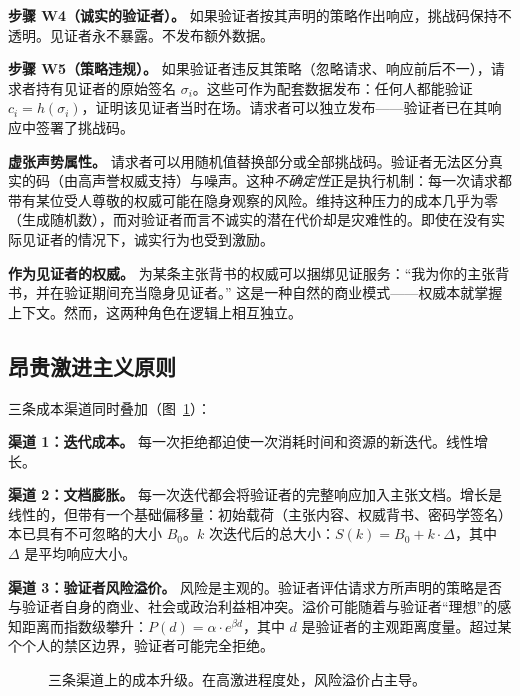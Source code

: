 \documentclass[11pt,a4paper,twocolumn]{article}
\begin{document}
\textbf{步骤 W4（诚实的验证者）。} 如果验证者按其声明的策略作出响应，挑战码保持不透明。见证者永不暴露。不发布额外数据。

\textbf{步骤 W5（策略违规）。} 如果验证者违反其策略（忽略请求、响应前后不一），请求者持有见证者的原始签名 $\sigma_i$。这些可作为配套数据发布：任何人都能验证 $c_i = h(\sigma_i)$，证明该见证者当时在场。请求者可以独立发布——验证者已在其响应中签署了挑战码。

\textbf{虚张声势属性。} 请求者可以用随机值替换部分或全部挑战码。验证者无法区分真实的码（由高声誉权威支持）与噪声。这种\emph{不确定性}正是执行机制：每一次请求都带有某位受人尊敬的权威可能在隐身观察的风险。维持这种压力的成本几乎为零（生成随机数），而对验证者而言不诚实的潜在代价却是灾难性的。即使在没有实际见证者的情况下，诚实行为也受到激励。

\textbf{作为见证者的权威。} 为某条主张背书的权威可以捆绑见证服务：“我为你的主张背书，并在验证期间充当隐身见证者。” 这是一种自然的商业模式——权威本就掌握上下文。然而，这两种角色在逻辑上相互独立。

\subsection{昂贵激进主义原则}

三条成本渠道同时叠加（图~\ref{fig:radicalism}）：

\textbf{渠道 1：迭代成本。} 每一次拒绝都迫使一次消耗时间和资源的新迭代。线性增长。

\textbf{渠道 2：文档膨胀。} 每一次迭代都会将验证者的完整响应加入主张文档。增长是线性的，但带有一个基础偏移量：初始载荷（主张内容、权威背书、密码学签名）本已具有不可忽略的大小 $B_0$。$k$ 次迭代后的总大小：$S(k) = B_0 + k \cdot \Delta$，其中 $\Delta$ 是平均响应大小。

\textbf{渠道 3：验证者风险溢价。} 风险是主观的。验证者评估请求方所声明的策略是否与验证者自身的商业、社会或政治利益相冲突。溢价可能随着与验证者“理想”的感知距离而指数级攀升：$P(d) = \alpha \cdot e^{\beta d}$，其中 $d$ 是验证者的主观距离度量。超过某个个人的禁区边界，验证者可能完全拒绝。

\begin{figure}[ht]
\centering
{}
\caption{三条渠道上的成本升级。在高激进程度处，风险溢价占主导。}
\label{fig:radicalism}
\end{figure}
\end{document}
